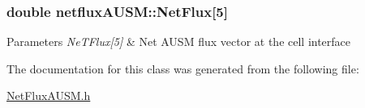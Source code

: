 \subsubsection[{\texorpdfstring{Net\+Flux}{NetFlux}}]{\setlength{\rightskip}{0pt plus 5cm}double netflux\+A\+U\+S\+M\+::\+Net\+Flux\mbox{[}5\mbox{]}}\hypertarget{classnetfluxAUSM_a8fb78535709581ad1f781aff25e61ff9}{}\label{classnetfluxAUSM_a8fb78535709581ad1f781aff25e61ff9}

\begin{DoxyParams}{Parameters}
{\em Ne\+T\+Flux\mbox{[}5\mbox{]}} & Net A\+U\+SM flux vector at the cell interface \\
\hline
\end{DoxyParams}


The documentation for this class was generated from the following file\+:\begin{DoxyCompactItemize}
\item 
\hyperlink{NetFluxAUSM_8h}{Net\+Flux\+A\+U\+S\+M.\+h}\end{DoxyCompactItemize}
